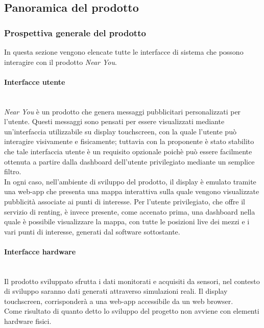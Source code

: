 \documentclass[11pt]{article}
\begin{document}
\begin{justify}
\subsection{Panoramica del prodotto}
\subsubsection{Prospettiva generale del prodotto} 
In questa sezione vengono elencate tutte le interfacce di sistema che possono interagire con il prodotto \textit{Near You}.

\paragraph{Interfacce utente}\mbox{}\\
\textit{Near You} è un prodotto che genera messaggi pubblicitari personalizzati per l'utente. Questi messaggi sono pensati per essere visualizzati mediante un'interfaccia utilizzabile su display touchscreen, con la quale l'utente può interagire visivamente e fisicamente; tuttavia con la proponente è stato stabilito che tale interfaccia utente 
è un requisito opzionale poichè può essere facilmente ottenuta a partire dalla dashboard dell'utente privilegiato mediante un semplice filtro.\\
In ogni caso, nell'ambiente di sviluppo del prodotto, il display è emulato tramite una web-app che presenta una mappa interattiva sulla quale vengono visualizzate pubblicità associate ai punti di interesse. Per l'utente 
privilegiato, che offre il servizio di renting, è invece presente, come accenato prima, una dashboard nella quale è possibile visualizzare la mappa, con tutte le posizioni live dei mezzi e i vari punti di interesse, 
generati dal software sottostante.

\paragraph{Interfacce hardware}\mbox{}\\
Il prodotto sviluppato sfrutta i dati monitorati e acquisiti da sensori, nel contesto di sviluppo saranno dati generati attraverso simulazioni reali. Il display touchscreen, corrisponderà a una web-app accessibile da un web browser.\\
Come risultato di quanto detto lo sviluppo del progetto non avviene con elementi hardware fisici.


\end{justify}
\end{document}
